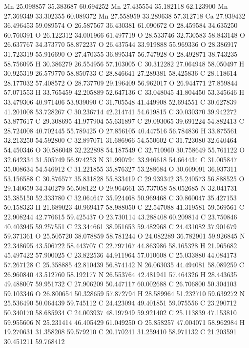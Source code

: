 \documentclass{article}
\begin{document}
Mn 25.098857 35.383687 60.694252
Mn 27.435554 35.182118 62.123900
Mn 27.369349 33.302355 60.089372
Mn 27.558959 33.289638 57.312718
Ca 27.939432 36.496453 59.089574
O 26.587567 36.430381 61.090672
O 28.459584 34.635250 60.760391
O 26.122312 34.001966 61.497719
O 28.533746 32.730583 58.843148
O 26.637767 34.373770 58.872237
O 26.437544 33.919888 55.969336
O 28.386917 31.723319 55.916690
O 27.470355 36.895347 56.747928
O 28.492871 38.743235 58.756095
H 30.386279 26.554956 57.103005
C 30.312282 27.064948 58.050497
H 30.925319 26.579770 58.850733
C 28.846641 27.289381 58.425836
C 28.118614 28.177032 57.408572
O 28.737709 29.196409 56.962017
O 26.944771 27.859844 57.071553
H 33.765459 42.205889 52.647136
C 33.048045 41.804450 53.345646
H 33.479306 40.971406 53.939090
C 31.705548 41.449908 52.694551
C 30.627839 41.201008 53.728267
C 30.236714 42.214741 54.619815
C 30.030370 39.942272 53.877617
C 29.308695 41.977904 55.631897
C 29.093065 39.691224 54.882413
C 28.724008 40.702445 55.789425
O 27.856105 40.447516 56.784836
H 33.875561 32.213250 54.592800
C 32.897071 31.686966 54.550602
C 31.723080 32.640464 54.450346
O 30.586048 32.222898 54.187549
C 32.710960 30.758649 55.761122
O 32.642334 31.505749 56.974253
N 31.990794 33.946618 54.664434
C 31.005847 35.008634 54.546912
C 31.221855 35.876327 53.288684
O 30.609091 36.937311 53.156588
C 30.876577 35.831828 55.833419
C 29.939342 35.240573 56.888525
O 29.140659 34.340279 56.508122
O 29.964661 35.737058 58.052685
N 32.041731 35.385150 52.333780
C 32.064647 35.924468 50.969468
C 30.860047 35.427153 50.158323
H 21.689023 40.969417 58.988050
C 22.547088 41.319581 59.569561
C 22.908244 42.776615 59.425437
O 23.730114 43.288408 60.209814
C 23.750846 40.403945 59.257551
C 23.344661 38.951653 59.482968
C 24.431082 37.901679 59.371361
O 25.505720 38.078859 58.781244
O 24.082289 36.782901 59.926845
N 22.348695 43.506722 58.443707
C 22.797167 44.863986 58.165328
H 21.965682 45.497422 57.900025
C 23.822536 44.911964 57.010608
C 25.033880 44.084173 57.267128
C 25.358885 42.810439 56.874142
N 26.063035 44.494081 58.089259
C 26.960840 43.512760 58.192177
N 26.553764 42.481941 57.464326
H 28.443635 49.488007 59.951732
C 27.906209 50.447117 60.002688
C 26.706800 50.304103 59.103346
O 26.800654 50.328659 57.872794
H 28.589964 51.232710 59.639272
N 25.536490 50.064439 59.745112
C 24.423094 49.401851 59.075556
C 23.290712 50.340170 58.685934
C 24.003937 48.197949 59.921402
C 25.113839 47.153810 59.955606
N 25.231414 46.405429 61.049250
O 25.858257 47.004071 58.962984
H 19.270631 31.358208 59.579210
C 20.170241 31.259410 58.971132
C 21.203591 30.451211 59.768412
\end{document}
